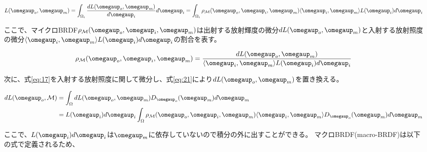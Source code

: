 \documentclass[a4j,xelatex,ja=standard]{bxjsarticle}
\begin{document}
\begin{equation}
    L(\boldsymbol{\omegaup}_o, \boldsymbol{\omegaup}_m) = \int_{\Omega_i} \frac{dL(\boldsymbol{\omegaup}_o, \boldsymbol{\omegaup}_m)}{d\boldsymbol{\omegaup}_i} d\boldsymbol{\omegaup}_i = \int_{\Omega_i} \rho_{\mathcal M}(\boldsymbol{\omegaup}_o, \boldsymbol{\omegaup}_i, \boldsymbol{\omegaup}_m) \langle \boldsymbol{\omegaup}_i, \boldsymbol{\omegaup}_m \rangle L(\boldsymbol{\omegaup}_i) d\boldsymbol{\omegaup}_i
    \label{eq:20}
\end{equation}

ここで、マイクロBRDF$\rho_{\mathcal M}(\boldsymbol{\omegaup}_o, \boldsymbol{\omegaup}_i, \boldsymbol{\omegaup}_m)$は出射する放射輝度の微分$dL(\boldsymbol{\omegaup}_o, \boldsymbol{\omegaup}_m)$と入射する放射照度の微分$\langle \boldsymbol{\omegaup}_i, \boldsymbol{\omegaup}_m \rangle L(\boldsymbol{\omegaup}_i) d\boldsymbol{\omegaup}_i$の割合を表す。

\begin{equation}
    \rho_{\mathcal M}(\boldsymbol{\omegaup}_o, \boldsymbol{\omegaup}_i, \boldsymbol{\omegaup}_m) = \frac{dL(\boldsymbol{\omegaup}_o, \boldsymbol{\omegaup}_m)}{\langle \boldsymbol{\omegaup}_i, \boldsymbol{\omegaup}_m \rangle L(\boldsymbol{\omegaup}_i) d\boldsymbol{\omegaup}_i}
    \label{eq:21}
\end{equation}

次に、式\eqref{eq:17}を入射する放射照度に関して微分し、式\eqref{eq:21}により$dL(\boldsymbol{\omegaup}_o, \boldsymbol{\omegaup}_m)$を置き換える。

\begin{equation}
    \begin{split}
        dL(\boldsymbol{\omegaup}_o, \mathcal{M})
        &= \int_{\Omega} dL(\boldsymbol{\omegaup}_o, \boldsymbol{\omegaup}_m) D_{\boldsymbol{\omegaup}_o}(\boldsymbol{\omegaup}_m) d\boldsymbol{\omegaup}_m \\
        &= L(\boldsymbol{\omegaup}_i) d\boldsymbol{\omegaup}_i \int_{\Omega} \rho_{\mathcal M}(\boldsymbol{\omegaup}_o, \boldsymbol{\omegaup}_i, \boldsymbol{\omegaup}_m) \langle \boldsymbol{\omegaup}_i, \boldsymbol{\omegaup}_m \rangle D_{\boldsymbol{\omegaup}_o}(\boldsymbol{\omegaup}_m) d\boldsymbol{\omegaup}_m
    \end{split}
    \label{eq:22}
\end{equation}

ここで、$L(\boldsymbol{\omegaup}_i)d\boldsymbol{\omegaup}_i$は$\boldsymbol{\omegaup}_m$に依存していないので積分の外に出すことができる。
マクロBRDF(macro-BRDF)は以下の式で定義されるため、
\end{document}

